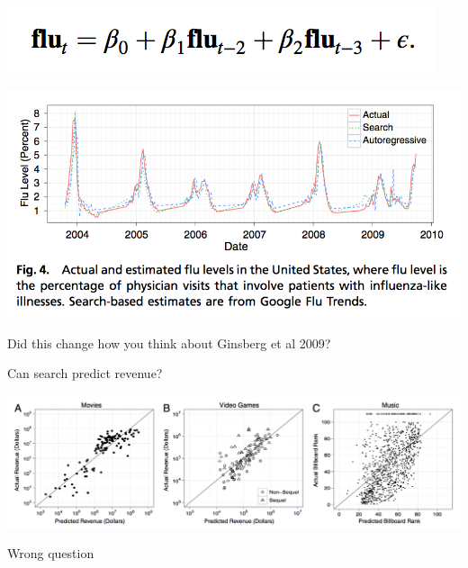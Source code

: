 \documentclass[aspectratio=169]{beamer}
\def\vf{\vfill}
\begin{document}
\begin{frame}

\begin{center}
\includegraphics[width=\textwidth]{figures/goel_predicting_2010_flu}
\end{center}

\end{frame}
\begin{frame}

\begin{center}
\includegraphics[width=\textwidth]{figures/goel_predicting_2010_fig4}
\end{center}

\end{frame}
\begin{frame}

{\Large
\begin{center}
Did this change how you think about Ginsberg et al 2009?
\end{center}
}

\end{frame}
\begin{frame}

Can search predict revenue?
\pause
\begin{center}
\includegraphics[width=\textwidth]{figures/goel_predicting_2010_fig2a-c}
\end{center}
\pause
\vf
Wrong question

\end{frame}
\end{document}
